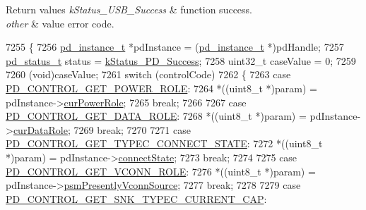 \begin{DoxyRetVals}{Return values}
{\em k\-Status\-\_\-\-U\-S\-B\-\_\-\-Success} & function success. \\
\hline
{\em other} & value error code. \\
\hline
\end{DoxyRetVals}

\begin{DoxyCode}
7255 \{
7256     \hyperlink{struct__pd__instance}{pd\_instance\_t} *pdInstance = (\hyperlink{struct__pd__instance}{pd\_instance\_t} *)pdHandle;
7257     \hyperlink{group__usb__pd__stack_ga04a1f331d9807a70ab9bb753f5ed1c80}{pd\_status\_t} status = \hyperlink{group__usb__pd__stack_ggaaad4cd00dd02567c6169429e3a895073acf06f954f9c52f560cea34df48c63555}{kStatus\_PD\_Success};
7258     uint32\_t caseValue = 0;
7259 
7260     (void)caseValue;
7261     \textcolor{keywordflow}{switch} (controlCode)
7262     \{
7263         \textcolor{keywordflow}{case} \hyperlink{group__usb__pd__stack_gga0edd2a390d28d96646bc71aac1858af1a04f2cae987c5f93bcd07bcffd679548e}{PD\_CONTROL\_GET\_POWER\_ROLE}:
7264             *((uint8\_t *)param) = pdInstance->\hyperlink{struct__pd__instance_aea65859fe3a8409ac66aa9f54fb119bf}{curPowerRole};
7265             \textcolor{keywordflow}{break};
7266 
7267         \textcolor{keywordflow}{case} \hyperlink{group__usb__pd__stack_gga0edd2a390d28d96646bc71aac1858af1a06f4d2e5460a98f33e36db26ee0576cf}{PD\_CONTROL\_GET\_DATA\_ROLE}:
7268             *((uint8\_t *)param) = pdInstance->\hyperlink{struct__pd__instance_a766dd3de4bdd34f1eebcd41d1425327a}{curDataRole};
7269             \textcolor{keywordflow}{break};
7270 
7271         \textcolor{keywordflow}{case} \hyperlink{group__usb__pd__stack_gga0edd2a390d28d96646bc71aac1858af1ad8f600ed0992d656036ca0a272d680ad}{PD\_CONTROL\_GET\_TYPEC\_CONNECT\_STATE}:
7272             *((uint8\_t *)param) = pdInstance->\hyperlink{struct__pd__instance_a4f8aff7c9d2b914a5be9f0bd297c197c}{connectState};
7273             \textcolor{keywordflow}{break};
7274 
7275         \textcolor{keywordflow}{case} \hyperlink{group__usb__pd__stack_gga0edd2a390d28d96646bc71aac1858af1a157e80a587dd98e5cd78e9927b4c4994}{PD\_CONTROL\_GET\_VCONN\_ROLE}:
7276             *((uint8\_t *)param) = pdInstance->\hyperlink{struct__pd__instance_a1b1254d08a7d1b7809c37ac0e1253ed5}{psmPresentlyVconnSource};
7277             \textcolor{keywordflow}{break};
7278 
7279         \textcolor{keywordflow}{case} \hyperlink{group__usb__pd__stack_gga0edd2a390d28d96646bc71aac1858af1a16509ea70890f75b3f97c5af3e7e04d5}{PD\_CONTROL\_GET\_SNK\_TYPEC\_CURRENT\_CAP}:

\end{DoxyCode}
